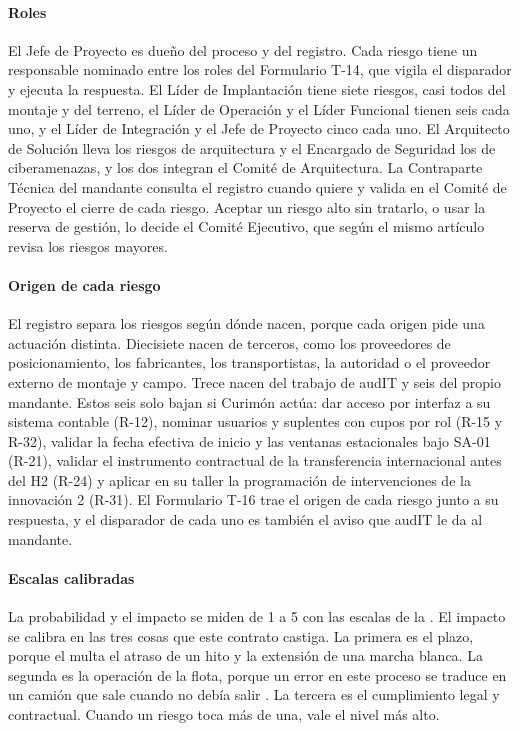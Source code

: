 \paragraph{Roles}
El Jefe de Proyecto es dueño del proceso y del registro. Cada riesgo tiene un responsable nominado entre
los roles del Formulario T-14, que vigila el disparador y ejecuta la respuesta. El Líder de Implantación
tiene siete riesgos, casi todos del montaje y del terreno, el Líder de Operación y el Líder Funcional
tienen seis cada uno, y el Líder de Integración y el Jefe de Proyecto cinco cada uno. El Arquitecto de Solución lleva los riesgos de arquitectura
y el Encargado de Seguridad los de ciberamenazas, y los dos integran el Comité de Arquitectura. La
Contraparte Técnica del mandante consulta el registro cuando quiere y valida en el Comité de Proyecto el
cierre de cada riesgo. Aceptar un riesgo alto sin tratarlo, o usar la reserva de gestión, lo decide el
Comité Ejecutivo, que según el mismo artículo revisa los riesgos mayores.

\paragraph{Origen de cada riesgo}
El registro separa los riesgos según dónde nacen, porque cada origen pide una actuación distinta.
Diecisiete nacen de terceros, como los proveedores de posicionamiento, los fabricantes, los transportistas,
la autoridad o el proveedor externo de montaje y campo. Trece nacen del trabajo de audIT y seis del propio mandante. Estos seis solo bajan si
Curimón actúa: dar acceso por interfaz a su sistema contable (R-12), nominar usuarios y suplentes con
cupos por rol (R-15 y R-32), validar la fecha efectiva de inicio y las ventanas estacionales bajo SA-01 (R-21), validar el
instrumento contractual de la transferencia internacional antes del H2 (R-24) y aplicar en su taller la programación de
intervenciones de la innovación 2 (R-31). El Formulario T-16 trae el origen de cada riesgo junto a su
respuesta, y el disparador de cada uno es también el aviso que audIT le da al mandante.

\paragraph{Escalas calibradas}
La probabilidad y el impacto se miden de 1 a 5 con las escalas de la . El impacto se
calibra en las tres cosas que este contrato castiga. La primera es el plazo, porque el  multa
el atraso de un hito y la extensión de una marcha blanca. La segunda es la operación de la flota, porque
un error en este proceso se traduce en un camión que sale cuando no debía salir
. La tercera es el cumplimiento legal y contractual. Cuando un riesgo toca más de
una, vale el nivel más alto.

